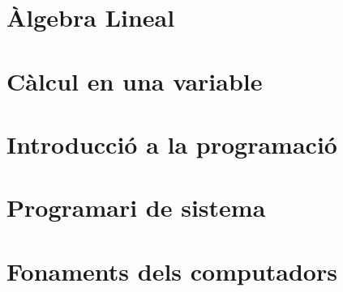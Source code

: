 \documentclass[a4paper,12pt]{article}
\author{EDUARDO PÉREZ MOTATO}
\begin{document}
    
    \tableofcontents
    \section{Àlgebra Lineal}
    
    \section{Càlcul en una variable}
    
    \section{Introducció a la programació}
    
    \section{Programari de sistema}
    
    \section{Fonaments dels computadors}
    
\end{document}

